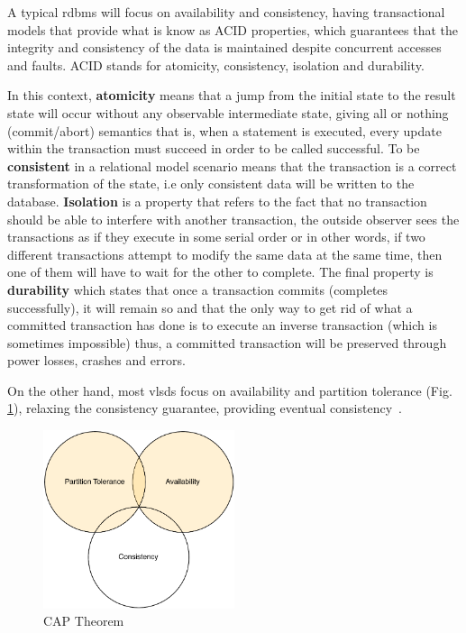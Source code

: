 A typical \ac{rdbms} will focus on availability and consistency, having transactional models that provide what is know as ACID properties, which guarantees that the integrity and consistency of the data is maintained despite concurrent accesses and faults. ACID stands for atomicity, consistency, isolation and durability. 

In this context, \textbf{atomicity} means that a jump from the initial state to the result state will occur without any observable intermediate state, giving all or nothing (commit/abort) semantics that is, when a statement is executed, every update within the transaction must succeed in order to be called successful. To be \textbf{consistent} in a relational model scenario means that the transaction is a correct transformation of the state, i.e only consistent data will be written to the database. \textbf{Isolation} is a property that refers to the fact that no transaction should be able to interfere with another transaction, the outside observer sees the transactions as if they execute in some serial order or in other words, if two different transactions attempt to modify the same data at the same time, then one of them will have to wait for the other to complete. The final property is \textbf{durability} which states that once a transaction commits (completes successfully), it will remain so and that the only way to get rid of what a committed transaction has done is to execute an inverse transaction (which is sometimes impossible) thus, a committed transaction will be preserved through power losses, crashes and errors.  

On the other hand, most \acp{vlsd} focus on availability and partition tolerance (Fig. \ref{fig:cap}), relaxing the consistency guarantee, providing eventual consistency~\cite{Vogels2008}. 

\begin{figure}[htb]
  \begin{center}
    \leavevmode
    \includegraphics[width=0.5\textwidth]{images/cap}
  \end{center}
  \caption{CAP Theorem}
  \label{fig:cap}
\end{figure}

